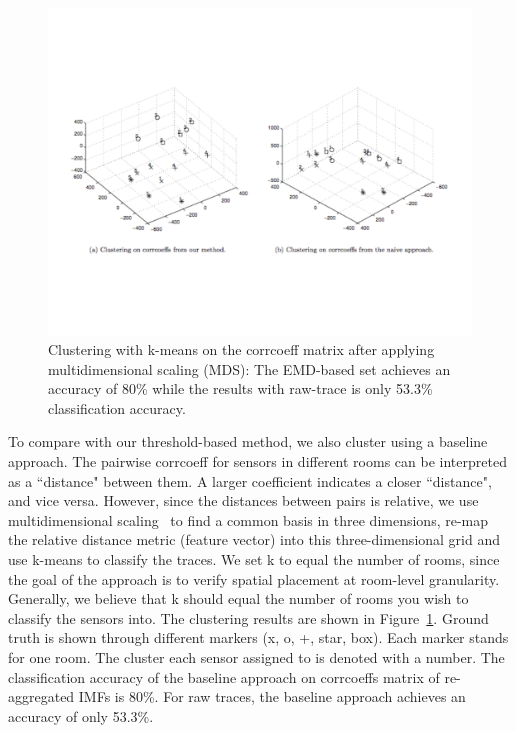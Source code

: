 \begin{figure}[ht!]
\centering
	\includegraphics[width=1.0\textwidth]{figs/Space_KmeanClustering}
\caption{Clustering with k-means on the corrcoeff matrix after applying multidimensional scaling (MDS): The EMD-based set achieves an accuracy of 80\% while the results with raw-trace is only 53.3\% classification accuracy.}
\label{fig:mds}
\end{figure}

To compare with our threshold-based method, we also cluster using a baseline approach. The pairwise corrcoeff for sensors in different rooms can be interpreted as a ``distance" between them.
A larger coefficient indicates a closer ``distance", and vice versa.  However, since the distances between pairs is relative, we use
multidimensional scaling~\cite{MDS} to find a common basis in three dimensions, re-map the relative distance metric (feature vector) into 
this three-dimensional grid and use k-means to classify the traces. %
We set k to equal the number of rooms, since the goal of the approach is to verify spatial placement at room-level granularity.  Generally, 
we believe that k should equal the number of rooms you wish to classify the sensors into. 
The clustering results are shown in Figure~\ref{fig:mds}.  Ground truth is shown through different markers (x, o, +, star, box). Each marker stands for one room. 
The cluster each sensor assigned to is denoted with a number. The classification accuracy of the baseline approach on corrcoeffs matrix of re-aggregated IMFs is 80\%. 
For raw traces, the baseline approach achieves an accuracy of only 53.3\%.






